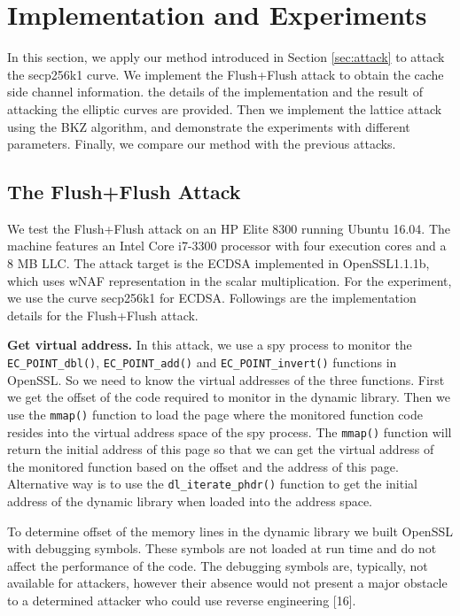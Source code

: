 \section{Implementation and Experiments}
\label{sec:impl&exper}
In this section, we apply our method introduced in Section \ref{sec:attack} to attack the secp256k1 curve.
  We implement the Flush+Flush attack  to obtain
the cache side channel information.
the details of the implementation and the result of attacking the elliptic curves are provided.
Then we implement the lattice attack using the BKZ algorithm,
 and demonstrate the experiments with different parameters.
Finally, we compare our method with the previous attacks.


\subsection{The Flush+Flush Attack}
\label{ffattack}
We test the Flush+Flush attack on an HP Elite 8300 running Ubuntu 16.04.
The machine features an Intel Core i7-3300 processor with four execution cores and a 8 MB LLC.
The attack target is the ECDSA implemented in OpenSSL1.1.1b, which uses wNAF representation in the scalar multiplication.
For the experiment, we use the curve secp256k1 for ECDSA.
Followings are the implementation details for the Flush+Flush attack.


\noindent\textbf{Get virtual address. }
In this attack, we use a spy process to monitor the  \verb+EC_POINT_dbl()+,  \verb+EC_POINT_add()+ and \verb+EC_POINT_invert()+ functions in OpenSSL.
So we need to know the virtual addresses of the three functions.
First we get the offset of the code required to monitor in the dynamic library.
Then we use the \verb+mmap()+ function to load the page where the monitored function code resides into the virtual address space of the spy process.
The \verb+mmap()+ function will return the initial address of this page so that we can get the virtual address of the monitored function based on the offset and the address of this page.
Alternative way is to use the \verb+dl_iterate_phdr()+ function to get the initial address of the dynamic library when loaded into the address space.

To determine offset of the memory lines in the  dynamic library  we built OpenSSL with debugging symbols.
 These symbols are not loaded at run time and do not affect the performance of the code.
The debugging symbols are, typically, not available for attackers,
 however their absence would not present a major obstacle to a determined attacker who could use reverse engineering [16].



